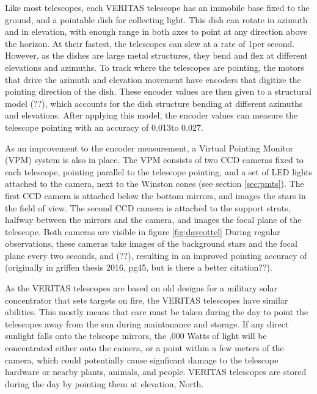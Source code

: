 Like most telescopes, each VERITAS telescope has an immobile base fixed to the ground, and a pointable dish for collecting light.
This dish can rotate in azimuth and in elevation, with enough range in both axes to point at any direction above the horizon.
At their fastest, the telescopes can slew at a rate of 1\degree per second.
However, as the dishes are large metal structures, they bend and flex at different elevations and azimuths.
To track where the telescopes are pointing, the motors that drive the azimuth and elevation movement have encoders that digitize the pointing direction of the dish.
These encoder values are then given to a structural model (??), which accounts for the dish structure bending at different azimuths and elevations.
After applying this model, the encoder values can measure the telescope pointing with an accuracy of 0.013\degree to 0.027\degree \cite{Veritas_Detector}.

As an improvement to the encoder measurement, a Virtual Pointing Monitor (VPM) system is also in place.
The VPM consists of two CCD cameras fixed to each telescope, pointing parallel to the telescope pointing, and a set of LED lights attached to the camera, next to the Winston cones (see section \ref{sec:pmts}).
The first CCD camera is attached below the bottom mirrors, and images the stars in the field of view.
The second CCD camera is attached to the support struts, halfway between the mirrors and the camera, and images the focal plane of the telescope.
Both cameras are visible in figure \ref{fig:davcottel}
During regular observations, these cameras take images of the background stars and the focal plane every two seconds, and (??), resulting in an improved pointing accuracy of \degree (originally in griffen thesis 2016, pg45, but is there a better citation??).

As the VERITAS telescopes are based on old designs for a military solar concentrator that sets targets on fire\cite{daviescotton}, the VERITAS telescopes have similar abilities.
This mostly means that care must be taken during the day to point the telescopes away from the sun during maintanance and storage.
If any direct sunlight falls onto the telscope mirrors, the ,000 Watts of light will be concentrated either onto the camera, or a point within a few meters of the camera, which could potentially cause signficant damage to the telescope hardware or nearby plants, animals, and people.
VERITAS telescopes are stored during the day by pointing them at \degree elevation, North.


